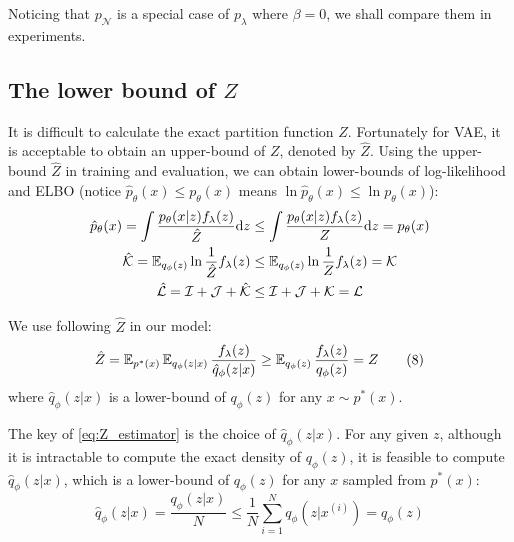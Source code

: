 Noticing that $p_\mathcal{N}$ is a special case of $p_\lambda$ where $\beta = 0$, we shall compare them in experiments.  

\subsection{The lower bound of $Z$}\label{subsec:determine_z}

It is difficult to calculate the exact partition function $Z$. Fortunately for VAE, it is acceptable to obtain an upper-bound of $Z$, denoted by $\hat{Z}$. Using the upper-bound $\hat{Z}$ in training and evaluation, we can obtain lower-bounds of log-likelihood and ELBO (notice $\hat{p}_\theta(x) \leq p_\theta(x)$ means $\ln \hat{p}_\theta(x) \leq \ln p_\theta(x)$):
\begin{align*}
	\hat{p}_\theta(x) = \int \frac{p_\theta(x|z) f_\lambda(z)}{\hat{Z}}  \mathrm{d} z &\leq \int \frac{p_\theta(x|z) f_\lambda(z)}{Z} \mathrm{d} z = p_\theta(x)  \\
	\mathcal{\hat{K}} = \operatorname{\mathbb{E}}_{q_\phi(z)} \ln \frac{1}{\hat{Z}} f_\lambda(z) &\leq \operatorname{\mathbb{E}}_{q_\phi(z)} \ln \frac{1}{Z}  f_\lambda(z) = \mathcal{K}   \\
    \mathcal{\hat{L}} =  \mathcal{I} + \mathcal{J} + \mathcal{\hat{K}} &\leq \mathcal{I} + \mathcal{J} + \mathcal{K} = \mathcal{L}
\end{align*}

We use following $\hat{Z}$ in our model:
\begin{align*}\label{eq:Z_estimator}
    \hat{Z} = \operatorname{\mathbb{E}}_{p^*(x)}\operatorname{\mathbb{E}}_{q_\phi(z|x)} \frac{f_\lambda(z)}{\hat{q}_\phi(z|x)} \geq
	\operatorname{\mathbb{E}}_{q_\phi(z)}\frac{f_\lambda(z)}{q_\phi(z)} = Z \tag{8}
\end{align*}
where $\hat{q}_\phi(z|x)$ is a lower-bound of $q_\phi(z)$ for any $x \sim p^*(x)$. 

The key of \cref{eq:Z_estimator} is the choice of $\hat{q}_\phi(z|x)$. For any given $z$, although it is intractable to compute the exact density of $q_\phi(z)$, it is feasible to compute $\hat{q}_\phi(z|x)$, which is a lower-bound of $q_\phi(z)$ for any $x$ sampled from $p^*(x)$:
\begin{equation*}
	\hat{q}_\phi(z|x) = \frac{q_\phi(z|x)}{N} \leq \frac{1}{N}\sum_{i=1}^N q_\phi(z|x^{(i)}) = q_\phi(z)
\end{equation*}

